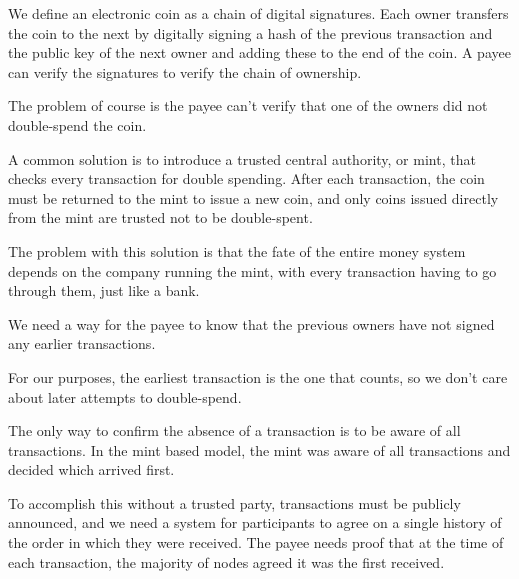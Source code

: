 We define an electronic coin as a chain of digital signatures. Each owner transfers the coin to the next by digitally signing a hash of the previous transaction and the public key of the next owner and adding these to the end of the coin. A payee can verify the signatures to verify the chain of ownership.

The problem of course is the payee can't verify that one of the owners did not double-spend the coin.

A common solution is to introduce a trusted central authority, or mint, that checks every transaction for double spending. After each transaction, the coin must be returned to the mint to issue a new coin, and only coins issued directly from the mint are trusted not to be double-spent.

The problem with this solution is that the fate of the entire money system depends on the company running the mint, with every transaction having to go through them, just like a bank.

We need a way for the payee to know that the previous owners have not signed any earlier transactions.

For our purposes, the earliest transaction is the one that counts, so we don't care about later attempts to double-spend.

The only way to confirm the absence of a transaction is to be aware of all transactions. In the mint based model, the mint was aware of all transactions and decided which arrived first.

To accomplish this without a trusted party, transactions must be publicly announced, and we need a system for participants to agree on a single history of the order in which they were received. The payee needs proof that at the time of each transaction, the majority of nodes agreed it was the first received.